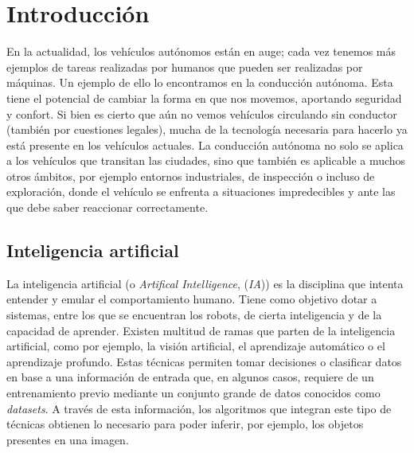 \chapter{Introducción}
\label{cap:capitulo1}
\setcounter{page}{1}

En la actualidad, los vehículos autónomos están en auge; cada vez tenemos más ejemplos de tareas realizadas por humanos que pueden ser realizadas por máquinas. Un ejemplo de ello lo encontramos en la conducción autónoma. Esta tiene el potencial de cambiar la forma en que nos movemos, aportando seguridad y confort. Si bien es cierto que aún no vemos vehículos circulando sin conductor (también por cuestiones legales), mucha de la tecnología necesaria para hacerlo ya está presente en los vehículos actuales. La conducción autónoma no solo se aplica a los vehículos que transitan las ciudades, sino que también es aplicable a muchos otros ámbitos, por ejemplo entornos industriales, de inspección o incluso de exploración, donde el vehículo se enfrenta a situaciones impredecibles y ante las que debe saber reaccionar correctamente.\\

\section{Inteligencia artificial}
\label{sec:ia}
La inteligencia artificial (o \textit{Artifical Intelligence}, (\textit{IA})) es la disciplina que intenta entender y emular el comportamiento humano. Tiene como objetivo dotar a sistemas, entre los que se encuentran los robots, de cierta inteligencia y de la capacidad de aprender. Existen multitud de ramas que parten de la inteligencia artificial, como por ejemplo, la visión artificial, el aprendizaje automático o el aprendizaje profundo. Estas técnicas permiten tomar decisiones o clasificar datos en base a una información de entrada que, en algunos casos, requiere de un entrenamiento previo mediante un conjunto grande de datos conocidos como \textit{datasets}. A través de esta información, los algoritmos que integran este tipo de técnicas obtienen lo necesario para poder inferir, por ejemplo, los objetos presentes en una imagen.\\

